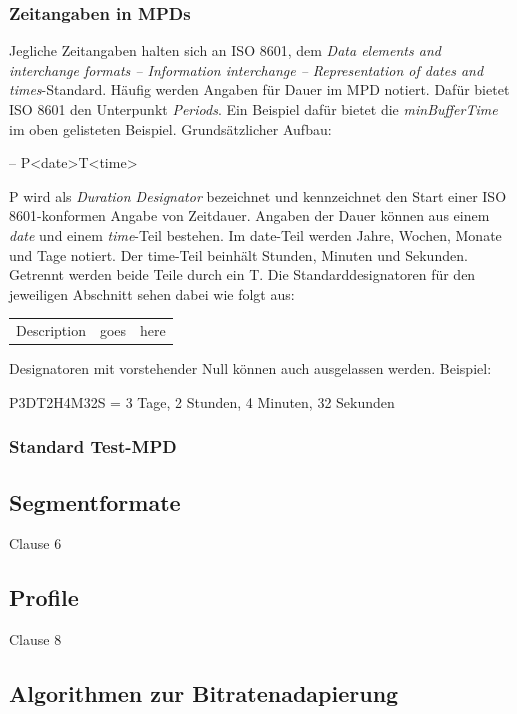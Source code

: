 \documentclass[paper = a4, fontsize = 12pt, parskip = half]{scrartcl} %
\begin{document}
\subsubsection{Zeitangaben in MPDs}
\label{iso8601_duration}
Jegliche Zeitangaben halten sich an ISO 8601, dem \textit{Data elements and interchange formats – Information interchange – Representation of dates and times}-Standard. Häufig werden Angaben für Dauer im MPD notiert. Dafür bietet ISO 8601 den Unterpunkt \textit{Periods}. Ein Beispiel dafür bietet die \textit{minBufferTime} im oben gelisteten Beispiel. Grundsätzlicher Aufbau:

-- P<date>T<time>

P wird als \textit{Duration Designator} bezeichnet und kennzeichnet den Start einer ISO 8601-konformen Angabe von Zeitdauer. Angaben der Dauer können aus einem \textit{date} und einem \textit{time}-Teil bestehen. Im date-Teil werden Jahre, Wochen, Monate und Tage notiert. Der time-Teil beinhält Stunden, Minuten und Sekunden. Getrennt werden beide Teile durch ein T. Die Standarddesignatoren für den jeweiligen Abschnitt sehen dabei wie folgt aus:

\begin{center}
    \begin{tabular}{c c c}
         Description & goes & here
    \end{tabular}
\end{center}

Designatoren mit vorstehender Null können auch ausgelassen werden. Beispiel:

P3DT2H4M32S = 3 Tage, 2 Stunden, 4 Minuten, 32 Sekunden

\subsubsection{Standard Test-MPD}

\subsection{Segmentformate}
Clause 6

\subsection{Profile}
\label{profiles}
Clause 8

\subsection{Algorithmen zur Bitratenadapierung}
\end{document}
